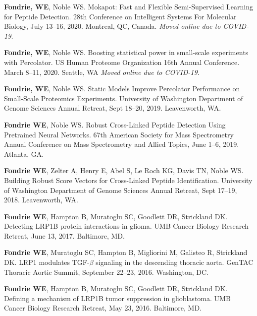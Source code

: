 \documentclass{article}
\newcommand{\mysection}[1]{\vspace{1ex {\bf \large \textrm{#1}} \quad \hrulefill}}
\begin{document}
\mysection{Poster Presentations}
\begin{etaremune}
  \item {\bf Fondrie, WE}, Noble WS. Mokapot: Fast and Flexible Semi-Supervised
    Learning for Peptide Detection. 28th Conference on Intelligent Systems For
    Molecular Biology, July 13--16, 2020. Montreal, QC, Canada. \textit{Moved
      online due to COVID-19.}
  
  \item {\bf Fondrie, WE}, Noble WS. Boosting statistical power in small-scale
    experiments with Percolator. US Human Proteome Organization 16th Annual
    Conference. March 8--11, 2020. Seattle, WA \textit{Moved online due to
      COVID-19.}
  
  \item {\bf Fondrie, WE}, Noble WS. Static Models Improve Percolator
    Performance on Small-Scale Proteomics Experiments. University of Washington
    Department of Genome Sciences Annual Retreat, Sept 18--20, 2019.
    Leavenworth, WA.
  
  \item {\bf Fondrie WE}, Noble WS. Robust Cross-Linked Peptide Detection Using
    Pretrained Neural Networks. 67th American Society for Mass Spectrometry
    Annual Conference on Mass Spectrometry and Allied Topics, June 1--6, 2019.
    Atlanta, GA.

  \item {\bf Fondrie WE}, Zelter A, Henry E, Abel S, Le Roch KG, Davis TN, Noble
    WS. Building Robust Score Vectors for Cross-Linked Peptide Identification.
    University of Washington Department of Genome Sciences Annual Retreat, Sept
    17--19, 2018. Leavenworth, WA.

  \item {\bf Fondrie WE}, Hampton B, Muratoglu SC, Goodlett DR, Strickland DK.
    Detecting LRP1B protein interactions in glioma. UMB Cancer Biology Research
    Retreat, June 13, 2017. Baltimore, MD.

  \item {\bf Fondrie WE}, Muratoglu SC, Hampton B, Migliorini M, Galisteo R,
    Strickland DK. LRP1 modulates TGF-$\beta$ signaling in the descending
    thoracic aorta. GenTAC Thoracic Aortic Summit, September 22--23, 2016.
    Washington, DC.

  \item {\bf Fondrie WE}, Hampton B, Muratoglu SC, Goodlett DR, Strickland DK.
    Defining a mechanism of LRP1B tumor suppression in glioblastoma. UMB Cancer
    Biology Research Retreat, May 23, 2016. Baltimore, MD.


\end{etaremune}
\end{document}

